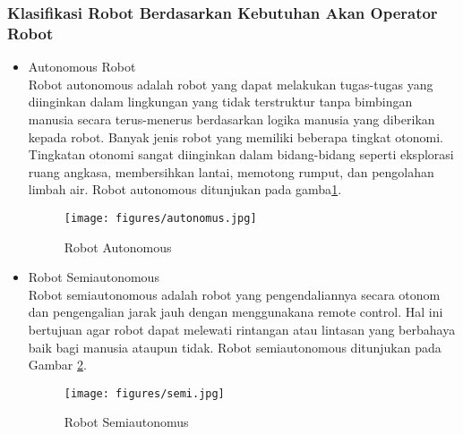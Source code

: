\subsubsection{Klasifikasi Robot Berdasarkan Kebutuhan Akan Operator Robot}
\begin{itemize}
    \item Autonomous Robot\\
    Robot autonomous adalah robot yang dapat melakukan tugas-tugas yang diinginkan dalam lingkungan yang tidak terstruktur tanpa bimbingan manusia secara terus-menerus berdasarkan logika manusia yang diberikan kepada robot. Banyak jenis robot yang memiliki beberapa tingkat otonomi. Tingkatan otonomi sangat diinginkan dalam bidang-bidang seperti eksplorasi ruang angkasa, membersihkan lantai, memotong rumput, dan pengolahan limbah air. Robot autonomous ditunjukan pada gamba\ref{fig:auto}. 
\begin{figure}[!htb]
 \centering
\texttt{[image: figures/autonomus.jpg]}
 \caption{Robot Autonomous}
 \label{fig:auto}
\end{figure}

    \item Robot Semiautonomous\\
    Robot semiautonomous adalah robot yang pengendaliannya secara otonom dan pengengalian jarak jauh dengan menggunakana remote control. Hal ini bertujuan agar robot dapat melewati rintangan atau lintasan yang berbahaya baik bagi manusia ataupun tidak. Robot semiautonomous ditunjukan pada Gambar \ref{fig:semi}.
\begin{figure}[!htb]
 \centering
 \texttt{[image: figures/semi.jpg]}
 \caption{Robot Semiautonomus}
 \label{fig:semi}
\end{figure}
\end{itemize}

